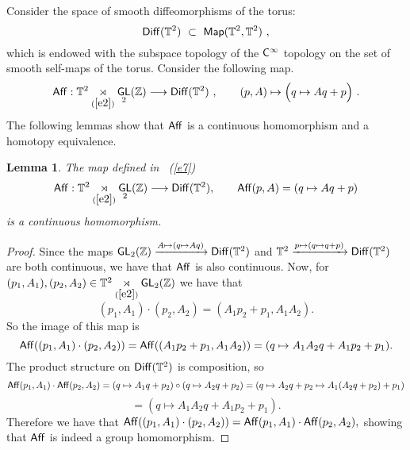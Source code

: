 \documentclass{amsart}
\newtheorem{lemma}[theorem]{Lemma}
\theoremstyle{definition}
\theoremstyle{remark}
\DeclareMathOperator{\Map}{{\sf Map}}
\DeclareMathOperator{\Diff}{{\sf Diff}}
\newcommand{\xra}{\xrightarrow}
\DeclareMathOperator{\GL}{\sf GL}
\DeclareMathOperator{\quot}{\sf quot}
\begin{document}


Consider the space of smooth diffeomorphisms of the torus:
\[
\Diff(\TT^2)
~\subset~
\Map(\TT^2 , \TT^2)
~,
\] 
which is endowed with the subspace topology of the $\mathsf C^\infty$ topology on the set of smooth self-maps of the torus.
Consider the following map.
\begin{equation}
\label{e7}
{\sf Aff}: \TT^2 \underset{(\ref{e2})}\rtimes \GL_2(\ZZ)
\longrightarrow
\Diff(\TT^2)
~,\qquad
(p,A)
\mapsto
\Bigl(
q\mapsto 
Aq + p
\Bigr)
~.
\end{equation}
The following lemmas show that ${\sf Aff}$ is a continuous homomorphism and a homotopy equivalence.
\begin{lemma} \label{t98}
The map defined in ~(\ref{e7}) $${\sf Aff}: \TT^2 \underset{(\ref{e2})}\rtimes \GL_2(\ZZ)
\longrightarrow
\Diff(\TT^2), 
 \qquad {\sf Aff}(p, A) = (q \mapsto Aq + p)$$
is a continuous homomorphism.
\end{lemma}
\begin{proof}
Since the maps $\GL_{2}(\ZZ) \xrightarrow{A \mapsto (q \mapsto{Aq})} \Diff(\TT^{2})$ and $\TT^{2} \xrightarrow{p \mapsto (q \mapsto q + p)} \Diff(\TT^{2})$ are both continuous, we have that ${\sf Aff}$ is also continuous. Now, for $(p_{1}, A_{1}), (p_{2}, A_{2}) \in  \TT^2 \underset{(\ref{e2})}\rtimes \GL_2(\ZZ)$ we have that $$(p_{1}, A_{1}) \cdot (p_{2}, A_{2}) = (A_{1}p_{2} + p_{1}, A_{1}A_{2}).$$ So the image of this map is $${\sf Aff}((p_{1}, A_{1}) \cdot (p_{2}, A_{2})) = {\sf Aff}((A_{1}p_{2} + p_{1}, A_{1}A_{2})) = (q \mapsto  A_{1}A_{2}q + A_{1}p_{2} + p_{1}).$$ The product structure on $\Diff(\TT^2)$ is composition, so $${\sf Aff}(p_{1}, A_{1}) \cdot {\sf Aff}(p_{2}, A_{2}) = (q\mapsto A_{1}q + p_{2}) \circ (q\mapsto A_{2}q + p_{2}) = (q \mapsto A_{2}q + p_{2} \mapsto A_{1}(A_{2}q + p_{2}) + p_{1})$$ $$= (q \mapsto A_{1}A_{2}q + A_{1}p_{2} + p_{1}).$$ Therefore we have that ${\sf Aff}((p_{1}, A_{1}) \cdot (p_{2}, A_{2})) = {\sf Aff}(p_{1}, A_{1}) \cdot {\sf Aff}(p_{2}, A_{2}),$ showing that ${\sf Aff}$ is indeed a group homomorphism. 
\end{proof}
\end{document}
